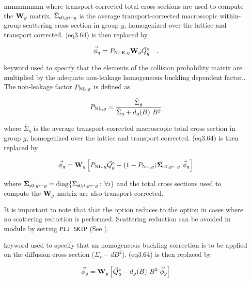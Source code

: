 \begin{ListeDeDescription}{mmmmmmm}
\noindent where transport-corrected total
cross sections are used to compute the ${\bf W}_g$ matrix. $\bar\Sigma_{{\rm s0},g \gets g}$ is the average
transport-corrected macroscopic within-group scattering cross section in group $g$,
homogenized over the lattice and transport corrected. \eq(eq3.64) is then replaced by
 
\begin{equation}
\vec\phi_g=P_{{\rm NLR},g} {\bf W}_g \vec Q^\diamond_g \ \ \ .
\label{eq:eq5.32}
\end{equation}

\item[\moc{PNL}] keyword used to specify that the elements of the collision
probability matrix are multiplied by the adequate non-leakage homogeneous buckling
dependent factor.\cite{ALSB1}. The non-leakage factor $P_{{\rm NL},g}$ is defined as

\begin{equation}
P_{{\rm NL},g}={\bar\Sigma_g\over{\bar\Sigma_g+d_g(B) \ B^2}}
\end{equation}

\noindent where $\bar\Sigma_g$ is the average transport-corrected macroscopic total cross section
in group $g$, homogenized over the lattice and transport corrected. \eq(eq3.64) is then replaced by

\begin{equation}
\vec\phi_g={\bf W}_g \left[ P_{{\rm NL},g} \vec Q^\diamond_g -(1-P_{{\rm NL},g}) {\bf \Sigma}_{{\rm s0},g\gets g} \ \vec\phi_g \right]
\label{eq:eq5.33b}
\end{equation}

\noindent where ${\bf \Sigma}_{{\rm s0},g\gets g}={\rm diag} \{ \Sigma_{{\rm s0},i,g \gets g}\> ;\> \forall i \}$
and the total cross sections used to compute the ${\bf W}_g$ matrix are also
transport-corrected.

\vskip 0.02cm

\noindent It is important to note that that the  option reduces to the  option in
cases where no scattering reduction is performed. Scattering reduction can be avoided in module
 by setting {\tt PIJ SKIP} (See ).

\item[\moc{SIGS}] keyword used to specify that an homogeneous buckling
correction is to be applied on the diffusion cross section ($\Sigma_{s} -
dB^{2}$). \eq(eq3.64) is then replaced by

\begin{equation}
\vec\phi_g={\bf W}_g\left[ \vec Q^\diamond_g-d_g(B) \ B^2 \ \vec\phi_g\right]
\label{eq:eq5.33}
\end{equation}


\end{ListeDeDescription}

